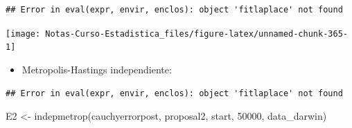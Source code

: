 \documentclass[
  12pt,
]{book}
\newenvironment{Shaded}{\begin{snugshade}}{\end{snugshade}}
\newcommand{\AttributeTok}[1]{\textcolor[rgb]{0.77,0.63,0.00}{#1}}
\newcommand{\DecValTok}[1]{\textcolor[rgb]{0.00,0.00,0.81}{#1}}
\newcommand{\FloatTok}[1]{\textcolor[rgb]{0.00,0.00,0.81}{#1}}
\newcommand{\FunctionTok}[1]{\textcolor[rgb]{0.00,0.00,0.00}{#1}}
\newcommand{\NormalTok}[1]{#1}
\newcommand{\OtherTok}[1]{\textcolor[rgb]{0.56,0.35,0.01}{#1}}
\newcommand{\SpecialCharTok}[1]{\textcolor[rgb]{0.00,0.00,0.00}{#1}}
\newcommand{\StringTok}[1]{\textcolor[rgb]{0.31,0.60,0.02}{#1}}
\providecommand{\tightlist}{%
  \setlength{\itemsep}{0pt}\setlength{\parskip}{0pt}}
\theoremstyle{definition}
\theoremstyle{definition}
\theoremstyle{definition}
\theoremstyle{definition}
\theoremstyle{remark}
\begin{document}
\begin{verbatim}
## Error in eval(expr, envir, enclos): object 'fitlaplace' not found
\end{verbatim}

\begin{Shaded}
\end{Shaded}

\begin{center}\texttt{[image: Notas-Curso-Estadistica\_files/figure-latex/unnamed-chunk-365-1]} \end{center}

\begin{itemize}
\tightlist
\item
  Metropolis-Hastings independiente:
\end{itemize}

\begin{Shaded}
\end{Shaded}

\begin{verbatim}
## Error in eval(expr, envir, enclos): object 'fitlaplace' not found
\end{verbatim}

\begin{Shaded}
\begin{Highlighting}[]
\NormalTok{E2 }\OtherTok{\textless{}{-}} \FunctionTok{indepmetrop}\NormalTok{(cauchyerrorpost, proposal2, start,}
    \DecValTok{50000}\NormalTok{, data\_darwin)}
\end{Highlighting}
\end{Shaded}
\end{document}
